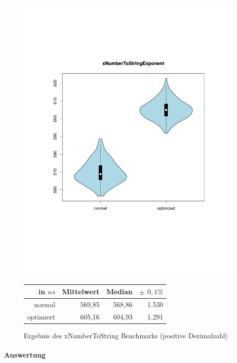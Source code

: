 \begin{figure}[H]
{		\includegraphics[trim=20mm 60mm 0mm 50mm,scale=0.50]{pictures/vioplot_xNumberToStringExponent.pdf}
	}

	\begin{table}[H]
	\centering
		\begin{tabular}{|r|r|r|r|}
			\hline
		   	in $ns$   & Mittelwert & Median & \bf{$\pm$ $0,1\%$} \\
		 	\hline
		 	\hline
		  	normal 	  & 569,85 & 568,86 & 1.530 \\
		 	optimiert & 605,16 & 604,93 & 1,291 \\ 
		  	\hline
		  	
		\end{tabular}
	\end{table}

	\caption{Ergebnis des xNumberToString Benchmarks (positive Dezimalzahl)}\label{bp:xNumExp}
\end{figure}

\paragraph{Auswertung}


